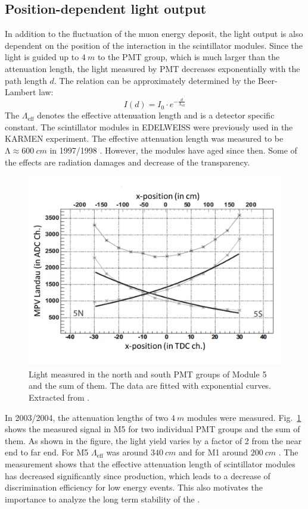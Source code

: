 \subsection{Position-dependent light output}
In addition to the fluctuation of the muon energy deposit, the light output is also dependent on the position of the interaction in the scintillator modules. Since the light is guided up to $\SI{4}{m}$ to the PMT group, which is much larger than the attenuation length, the light measured by PMT decreases exponentially with the path length $d$. The relation can be approximately determined by the Beer-Lambert law:
\begin{equation}
  I(d)=I_{0}\cdot e^{-\frac{d}{\mathrm{\Lambda}_{\mathrm{eff}}}}
\end{equation}
The $\Lambda_{\mathrm{eff}}$ denotes the effective attenuation length and is a detector specific constant.
The scintillator modules in EDELWEISS were previously used in the KARMEN experiment. The effective attenuation length was measured to be $\mathrm{\Lambda} \approx \SI{600}{cm}$ in 1997/1998 \cite{Rei98}. However, the modules have aged since then. Some of the effects are radiation damages and decrease of the transparency.

\begin{figure}[ht!]
  \centering
  \includegraphics[width=0.6\textwidth{}]{./fig/pos-dependent.png}
  \caption{Light measured in the north and south PMT groups of Module 5 and the sum of them. The data are fitted with exponential curves. Extracted from \cite{Hab04}.}
  \label{fig:pos-dependent}
\end{figure}

In 2003/2004, the attenuation lengths of two $\SI{4}{m}$ modules were measured. Fig.\ \ref{fig:pos-dependent} shows the measured signal in M5 for two individual PMT groups and the sum of them. As shown in the figure, the light yield varies by a factor of 2 from the near end to far end.
For M5 $\Lambda_{\mathrm{eff}}$ was around $\SI{340}{cm}$ and for M1 around $\SI{200}{cm}$ \cite{Hab04}. The measurement shows that the effective attenuation length of scintillator modules has decreased significantly since production, which leads to a decrease of discrimination efficiency for low energy events. This also motivates the importance to analyze the long term stability of the \mvs.



